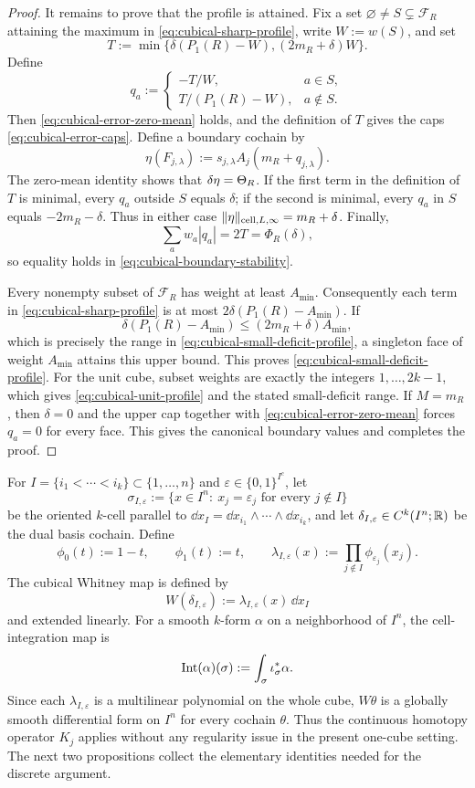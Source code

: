 \begin{proof}
It remains to prove that the profile is attained. Fix a set
$\varnothing\ne S\subsetneq\mathcal F_R$ attaining the maximum in
\eqref{eq:cubical-sharp-profile}, write $W:=w(S)$, and set
\[
T:=\min\{\delta(P_1(R)-W),(2m_R+\delta)W\}.
\]
Define
\begin{equation}
\label{eq:cubical-profile-extremizer}
q_a:=
\begin{cases}
-T/W,&a\in S,\\
T/(P_1(R)-W),&a\notin S.
\end{cases}
\end{equation}
Then \eqref{eq:cubical-error-zero-mean} holds, and the definition of $T$
gives the caps \eqref{eq:cubical-error-caps}.  Define a boundary cochain by
\[
\eta(F_{j,\lambda})
:=s_{j,\lambda}A_j(m_R+q_{j,\lambda}).
\]
The zero-mean identity shows that $\delta\eta=\Theta_R$. If the first term in
the definition of $T$ is minimal, every $q_a$ outside $S$ equals $\delta$; if
the second is minimal, every $q_a$ in $S$ equals $-2m_R-\delta$. Thus in
either case $\lVert \eta \rVert_{\mathrm{cell},L,\infty}=m_R+\delta$. Finally,
\[
\sum_aw_a|q_a|=2T=\Phi_R(\delta),
\]
so equality holds in \eqref{eq:cubical-boundary-stability}.

Every nonempty subset of $\mathcal F_R$ has weight at least $A_{\min}$.
Consequently each term in \eqref{eq:cubical-sharp-profile} is at most
$2\delta(P_1(R)-A_{\min})$. If
\[
\delta(P_1(R)-A_{\min})
\le(2m_R+\delta)A_{\min},
\]
which is precisely the range in
\eqref{eq:cubical-small-deficit-profile}, a singleton face of weight
$A_{\min}$ attains this upper bound. This proves
\eqref{eq:cubical-small-deficit-profile}. For the unit cube, subset weights
are exactly the integers $1,\ldots,2k-1$, which gives
\eqref{eq:cubical-unit-profile} and the stated small-deficit range. If
$M=m_R$, then $\delta=0$ and the upper cap together with
\eqref{eq:cubical-error-zero-mean} forces $q_a=0$ for every face. This gives
the canonical boundary values and completes the proof.
\end{proof}

For $I=\{i_1<\cdots<i_k\}\subset\{1,\dots,n\}$ and
$\varepsilon\in\{0,1\}^{I^c}$, let
\[
\sigma_{I,\varepsilon}
:=
\{x\in I^n:\ x_j=\varepsilon_j \text{ for every } j\notin I\}
\]
be the oriented $k$-cell parallel to
$\dd x_I=\dd x_{i_1}\wedge\cdots\wedge \dd x_{i_k}$, and let
$\delta_{I,\varepsilon}\in C^k(I^n;\mathbb{R})$ be the dual basis cochain. Define
\[
\phi_0(t):=1-t,
\qquad
\phi_1(t):=t,
\qquad
\lambda_{I,\varepsilon}(x):=
\prod_{j\notin I}\phi_{\varepsilon_j}(x_j).
\]
The cubical Whitney map is defined by
\[
W(\delta_{I,\varepsilon}):=
\lambda_{I,\varepsilon}(x)\,\dd x_I
\]
and extended linearly. For a smooth $k$-form $\alpha$ on a neighborhood of
$I^n$, the cell-integration map is
\[
\operatorname{Int}(\alpha)(\sigma):=
\int_\sigma \iota_\sigma^\ast\alpha.
\]
Since each $\lambda_{I,\varepsilon}$ is a multilinear polynomial on the whole
cube, $W\theta$ is a globally smooth differential form on $I^n$ for every
cochain $\theta$. Thus the continuous homotopy operator $K_j$ applies without
any regularity issue in the present one-cube setting. The next two
propositions collect the elementary identities needed for the discrete
argument.

